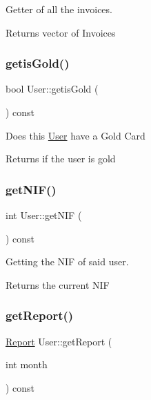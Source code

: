 Getter of all the invoices. 

\begin{DoxyReturn}{Returns}
vector of Invoices 
\end{DoxyReturn}
\mbox{\label{class_user_abd33fb93abc0209808bab9ffc6c2482c}} 
\subsubsection{\texorpdfstring{getis\+Gold()}{getisGold()}}
{\footnotesize\ttfamily bool User\+::getis\+Gold (\begin{DoxyParamCaption}{ }\end{DoxyParamCaption}) const}

Does this \mbox{\hyperlink{class_user}{User}} have a Gold Card \begin{DoxyReturn}{Returns}
if the user is gold 
\end{DoxyReturn}
\mbox{\label{class_user_a5e98c1820005dd6915bccd75bd573cea}} 
\subsubsection{\texorpdfstring{get\+N\+I\+F()}{getNIF()}}
{\footnotesize\ttfamily int User\+::get\+N\+IF (\begin{DoxyParamCaption}{ }\end{DoxyParamCaption}) const}



Getting the N\+IF of said user. 

\begin{DoxyReturn}{Returns}
the current N\+IF 
\end{DoxyReturn}
\mbox{\label{class_user_a655a16e4a6e044d973b54073cdb4bc96}} 
\subsubsection{\texorpdfstring{get\+Report()}{getReport()}}
{\footnotesize\ttfamily \mbox{\hyperlink{class_report}{Report}} User\+::get\+Report (\begin{DoxyParamCaption}\item[{int}]{month }\end{DoxyParamCaption}) const}

